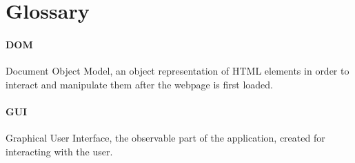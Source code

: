 \section{Glossary}

\paragraph{DOM} Document Object Model, an object representation of HTML elements in order to interact and manipulate them after the webpage is first loaded.

\paragraph{GUI} Graphical User Interface, the observable part of the application, created for interacting with the user.


